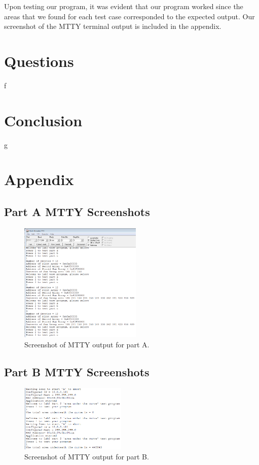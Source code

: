 \documentclass[10pt, letterpaper, titlepage]{article} %
\begin{document}
\begin{multicols*}{2}
Upon testing our program, it was evident that our program worked since the areas that we found for each test case corresponded to the expected output. Our screenshot of the MTTY terminal output is included in the appendix.

\section{Questions}
f

\section{Conclusion}
g


\end{multicols*}

\newpage

\section{Appendix}
\subsection{Part A MTTY Screenshots}
\begin{figure}[H]
   \includegraphics[width=0.52\textwidth]{mttypartA.png}
   \centering  
   \caption{Screenshot of MTTY output for part A.} 
   \label{figure:3}
\end{figure}

\subsection{Part B MTTY Screenshots}
\begin{figure}[H]
   \includegraphics[width=0.45\textwidth]{mttypartB.png}
   \centering  
   \caption{Screenshot of MTTY output for part B.} 
   \label{figure:3}
\end{figure}
\end{document}
